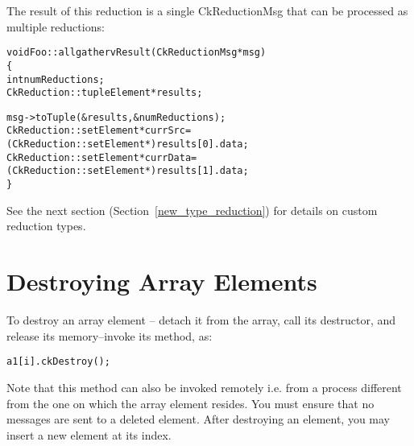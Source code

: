 The result of this reduction is a single CkReductionMsg that can be processed
as multiple reductions:

\begin{alltt}
void Foo::allgathervResult (CkReductionMsg* msg)
\{
  int numReductions;
  CkReduction::tupleElement* results;

  msg->toTuple(\&results, \&numReductions);
  CkReduction::setElement* currSrc  = (CkReduction::setElement*)results[0].data;
  CkReduction::setElement* currData = (CkReduction::setElement*)results[1].data;
\}
\end{alltt}

See the next section (Section~\ref{new_type_reduction}) for details on
custom reduction types.

\section{Destroying Array Elements}

To destroy an array element -- detach it from the array,
call its destructor, and release its memory--invoke its 
 method, as:

\begin{alltt}
a1[i].ckDestroy();
\end{alltt}

Note that this method can also be invoked remotely i.e. from 
a process different from the one on which the array element resides.
You must ensure that no messages are sent to a deleted element. 
After destroying an element, you may insert a new element at
its index. 
